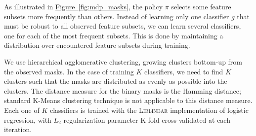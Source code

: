 

As illustrated in \hyperref[fig:mdp_masks]{Figure~\ref*{fig:mdp_masks}}, the policy $\pi$ selects some feature subsets more frequently than others.
Instead of learning only one classifier $g$ that must be robust to all observed feature subsets, we can learn several classifiers, one for each of the most frequent subsets.
This is done by maintaining a distribution over encountered feature subsets during training.

We use hierarchical agglomerative clustering, growing clusters bottom-up from the observed masks.
In the case of training $K$ classifiers, we need to find $K$ clusters such that the masks are distributed as evenly as possible into the clusters.
The distance measure for the binary masks is the Hamming distance; standard K-Means clustering technique is not applicable to this distance measure.
Each one of $K$ classifiers is trained with the \textsc{Liblinear} implementation of logistic regression, with $L_2$ regularization parameter K-fold cross-validated at each iteration.

